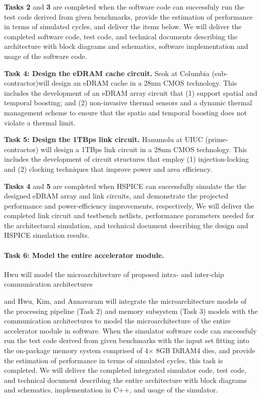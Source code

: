 \noindent
\textbf{Tasks 2} and \textbf{3} are completed when the software code can successfuly run the test code derived from given benchmarks, provide the estimation of performance in terms of simulated cycles, and deliver the items below.
We will deliver the completed software code, test code, and technical documents describing the architecture with block diagrams and schematics, software implementation and usage of the software code.

\noindent
\textbf{Task 4: Design the eDRAM cache circuit.}
Seok at Columbia (sub-contractor)will design an eDRAM cache in a 28nm CMOS technology.
This includes the development of an eDRAM array circuit that (1) support spatial and temporal boosting; and (2) non-invasive thermal sensors and a dynamic thermal management scheme to ensure that the spatio and temporal boosting does not violate a thermal limit.

\noindent
\textbf{Task 5: Design the 1TBps link circuit.}
Hanumolu at UIUC (prime-contractor) will design a 1TBps link circuit in a 28nm CMOS technology.
This includes the development of circuit structures that employ (1) injection-locking and (2) clocking techniques that improve power and area efficiency. 

\noindent
\textbf{Tasks 4} and \textbf{5} are completed when HSPICE can successfully simulate the the designed eDRAM array and link circuits, and demonstrate the projected performance and power-efficiency improvements, respectively, 
We will deliver the completed link circuit and testbench netlists, performance parameters needed for the architectural simulation, and technical document describing the design and HSPICE simulation results.

\noindent
\paragraph{Task 6: Model the entire accelerator module.}
Hwu will model the microarchitecture of proposed intra- and inter-chip communication architectures 

and Hwu, Kim, and Annavaram will integrate the microarchitecture models of the processing pipeline (Task 2) and memory subsystem (Task 3) models with the communication architectures to model the microarchitecture of the entire accelerator module in software. 
When the simulator software code can successfuly run the test code derived from given benchmarks with the input set fitting into the on-package memory system comprised of 4$\times$ 8GB DiRAM4 dies, and provide the estimation of performance in terms of simulated cycles, this task is completed.
We will deliver the completed integrated simulator code, test code, and technical document describing the entire architecture with block diagrams and schematics, implementation in C++, and usage of the simulator.


